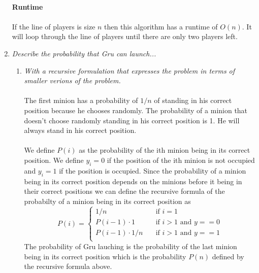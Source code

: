\documentclass[12pt]{article}
\begin{document}
\begin{enumerate}
		\\
		\textbf{Runtime}\\
		\\
		If the line of players is size $n$ then this algorithm has a runtime of $O(n)$.  It will loop through the line of players until there are only two players left.

		\newpage
		\item \textit{Describe the probability that Gru can launch...}
		\begin{enumerate}
			\item \textit{With a recursive formulation that expresses the problem in terms of smaller verions of the problem.}\\
			\\
			The first minion has a probability of $1/n$ of standing in his correct position because he chooses randomly.  The probability of a minion that doesn't choose randomly standing in his correct position is 1.  He will always stand in his correct position.\\
			\\  
			We define $P(i)$ as the probability of the ith minion being in its correct position. We define $y_i=0$ if the position of the ith minion is not occupied and $y_i=1$ if the position is occupied.  Since the probability of a minion being in its correct position depends on the minions before it being in their correct positions we can define the recursive formula of the probabilty of a minion being in its correct position as 
			$$
			P(i) =
			\begin{cases}
			1/n & \quad \text{if } i = 1\\
			P(i-1) \cdot 1 & \quad \text{if } i > 1 \text{ and } y==0\\
			P(i-1) \cdot 1/n & \quad \text{if } i > 1 \text{ and } y==1\\
			\end{cases}
			$$
			The probability of Gru lauching is the probability of the last minion being in its correct position which is the probability $P(n)$ defined by the recursive formula above.


\end{enumerate}
\end{enumerate}
\end{document}
